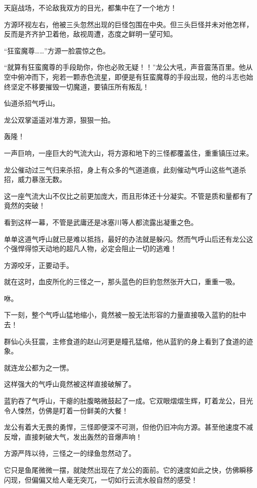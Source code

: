 
\begin{this_body}

天庭战场，不论敌我双方的目光，都集中在了一个地方！

方源环视左右，他被三头忽然出现的巨怪包围在中央。但三头巨怪并未对他怎样，反而是齐齐护卫着他，敌视周遭，态度之鲜明一望可知。

“狂蛮魔尊……”方源一脸震惊之色。

“就算有狂蛮魔尊的手段助你，你也必败无疑！！”龙公大吼，声音震荡百里。他从空中俯冲而下，宛若一颗赤色流星，即便是有狂蛮魔尊的手段出现，他的斗志也始终坚定不移要摧毁一切魔道，要镇压所有叛乱！

仙道杀招气呼山。

龙公双掌遥遥对准方源，狠狠一拍。

轰隆！

一声巨响，一座巨大的气流大山，将方源和地下的三怪都覆盖住，重重镇压过来。

龙公催动过三气归来杀招，身上有众多的气道道痕，此刻催动气呼山这些气道杀招，威力暴涨无数。

这一座气流大山不仅比之前更加庞大，而且形体还十分凝实。不管是质和量都有了竟然的突破！

看到这样一幕，不管是武庸还是冰塞川等人都流露出凝重之色。

单单这道气呼山就已是难以抵挡，最好的办法就是躲闪。然而气呼山后还有龙公这个强悍得惊天动地的超凡人物，必定会阻止一切的逃难！

方源咬牙，正要动手。

就在这时，血皮所化的三怪之一，那头蓝色的巨豹忽然张开大口，重重一吸。

咻。

下一刻，整个气呼山猛地缩小，竟然被一股无法形容的力量直接吸入蓝豹的肚中去！

群仙心头狂震，主修食道的赵山河更是瞳孔猛缩，他从蓝豹的身上看到了食道的迹象。

就连龙公都为之一愣。

这样强大的气呼山竟然被这样直接破解了。

蓝豹吞了气呼山，干瘪的肚腹略微鼓起了一成。它双眼熠熠生辉，盯着龙公，目光令人悚然，仿佛是盯着一份鲜美的大餐！

龙公有着大无畏的勇悍，三怪即便深不可测，但他仍旧冲向方源。甚至他速度不减反增，直接刺破大气，发出轰然的音爆声响！

方源严阵以待，三怪之一的绿鱼忽然动了。

它只是鱼尾微微一摆，就陡然出现在了龙公的面前。它的速度如此之快，仿佛瞬移闪现，但偏偏又给人毫无突兀，一切如行云流水般自然的感受！


\end{this_body}
